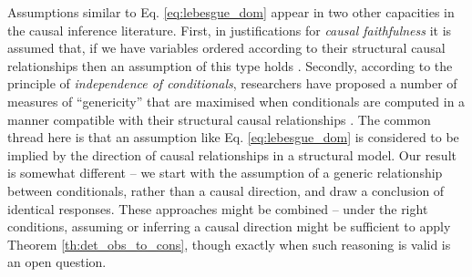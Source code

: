 Assumptions similar to Eq. \eqref{eq:lebesgue_dom} appear in two other capacities in the causal inference literature. First, in justifications for \emph{causal faithfulness} it is assumed that, if we have variables ordered according to their structural causal relationships then an assumption of this type holds \citet{meek_strong_1995}. Secondly, according to the principle of \emph{independence of conditionals}, researchers have proposed a number of measures of ``genericity'' that are maximised when conditionals are computed in a manner compatible with their structural causal relationships \citep{lemeire_replacing_2013}. The common thread here is that an assumption like Eq. \eqref{eq:lebesgue_dom} is considered to be implied by the direction of causal relationships in a structural model. Our result is somewhat different -- we start with the assumption of a generic relationship between conditionals, rather than a causal direction, and draw a conclusion of identical responses. These approaches might be combined -- under the right conditions, assuming or inferring a causal direction might be sufficient to apply Theorem \ref{th:det_obs_to_cons}, though exactly when such reasoning is valid is an open question.



